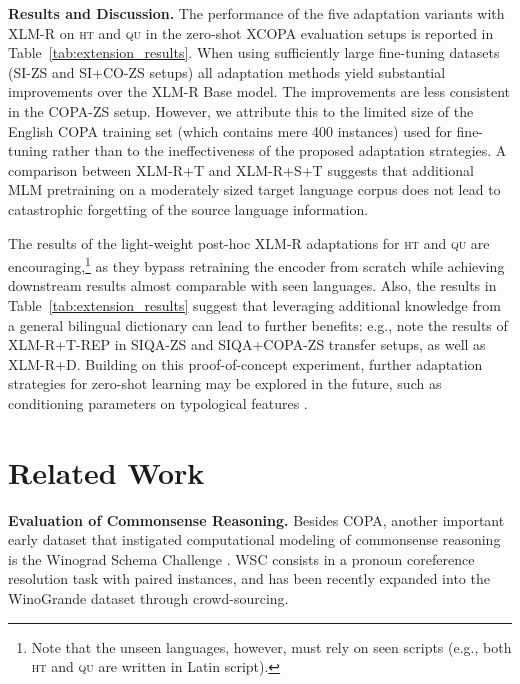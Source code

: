 \documentclass[11pt,a4paper]{article}
\begin{document}
\vspace{1.6mm}
\noindent \textbf{Results and Discussion.} The performance of the five adaptation variants with XLM-R on \textsc{ht} and \textsc{qu} in the zero-shot XCOPA evaluation setups is reported in Table~\ref{tab:extension_results}. 
When using sufficiently large fine-tuning datasets (SI-ZS and SI+CO-ZS setups) all adaptation methods yield substantial improvements over the XLM-R Base model.  The improvements are less consistent in the COPA-ZS setup. However, we attribute this to the limited size of the English COPA training set (which contains mere 400 instances) used for fine-tuning rather than to the ineffectiveness of the proposed adaptation strategies. A comparison between XLM-R+T and XLM-R+S+T suggests that additional MLM pretraining on a moderately sized target language corpus does not lead to catastrophic forgetting of the source language information. 



The results of the light-weight post-hoc XLM-R adaptations for \textsc{ht} and \textsc{qu} are encouraging,\footnote{Note that the unseen languages, however, must rely on seen scripts (e.g., both \textsc{ht} and \textsc{qu} are written in Latin script).} 
as they bypass retraining the encoder from scratch 
while achieving downstream results almost comparable with seen languages.
Also, the results in Table~\ref{tab:extension_results} suggest that leveraging additional knowledge from a general bilingual dictionary can lead to further benefits: e.g., note the results of XLM-R+T-REP in SIQA-ZS and SIQA+COPA-ZS transfer setups, as well as XLM-R+D. Building on this proof-of-concept experiment, further adaptation strategies for zero-shot learning may be explored in the future, such as conditioning parameters on typological features \citep{ponti2019towards}.





















%
 
\section{Related Work}
\label{s:related}
\noindent \textbf{Evaluation of Commonsense Reasoning.} 
Besides COPA, another important early dataset that instigated computational modeling of commonsense reasoning is the Winograd Schema Challenge \cite[WSC;][]{Levesque:2012wsc,Morgenstern:2015aaai}. WSC consists in a pronoun coreference resolution task with paired instances, 
and has been recently expanded into the WinoGrande dataset \cite{Sakaguchi:2020aaai} through crowd-sourcing.
\end{document}
